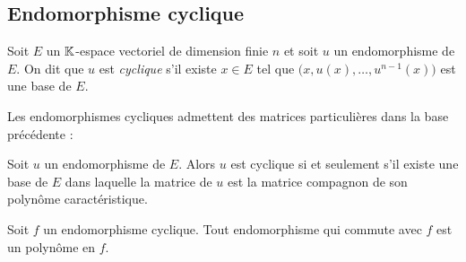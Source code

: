 \subsection{Endomorphisme cyclique}

\begin{defi}
    Soit $E$ un $\mathbb{K}$-espace vectoriel de dimension finie $n$ et soit $u$ un endomorphisme de $E$. On dit que $u$ est \emph{cyclique} s'il existe $x \in E$ tel que $\big(x, u(x), \dots, u^{n-1}(x) \big)$ est une base de $E$. 
\end{defi}

Les endomorphismes cycliques admettent des matrices particulières dans la base précédente :

\begin{prop}
    Soit $u$ un endomorphisme de $E$. Alors $u$ est cyclique si et seulement s'il existe une base de $E$ dans laquelle la matrice de $u$ est la matrice compagnon de son polynôme caractéristique.
\end{prop}

\begin{prop}
    Soit $f$ un endomorphisme cyclique. Tout endomorphisme qui commute avec $f$ est un polynôme en $f$.
\end{prop}

